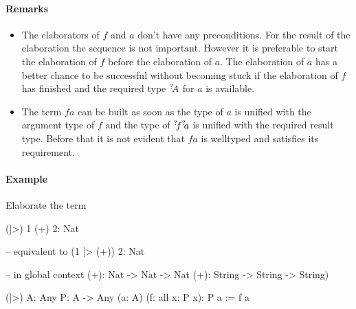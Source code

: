 \paragraph{Remarks}

\begin{itemize}
    \item The elaborators of $f$ and $a$ don't have any preconditions. For the
        result of the elaboration the sequence is not important. However it is
        preferable to start the elaboration of $f$ before the elaboration of
        $a$. The elaboration of $a$ has a better chance to be successful without
        becoming stuck if the elaboration of $f$ has finished and the required
        type ${{}^? \kern-0.2em A}$ for $a$ is available.

    \item The term $fa$ can be built as soon as the type of $a$ is unified with
        the argument type of $f$ and the type of ${{}^? \kern-0.2em f} {{}^? \kern-0.2em a}$ is unified
        with the required result type. Before that it is not evident that $fa$ is
        welltyped and satisfies its requirement.
\end{itemize}




\paragraph{Example}
Elaborate the term
\begin{alba}
    (|>) 1 (+) 2: Nat

    -- equivalent to
    (1 |> (+)) 2: Nat

    -- in global context
    (+): Nat -> Nat -> Nat
    (+): String -> String -> String)

    (|>) {A: Any} {P: A -> Any} (a: A) (f: all x: P x): P a
    :=
        f a
\end{alba}


